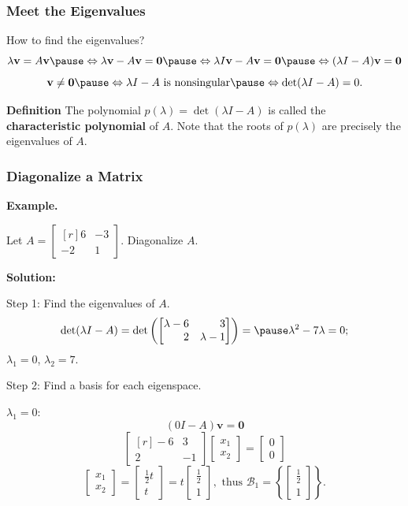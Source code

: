 \documentclass[10pt]{beamer}
\begin{document}
\begin{frame}
\frametitle{Meet the Eigenvalues}
How to find the eigenvalues?\pause
\[
\lambda\mathbf v = A\mathbf v\pause \Leftrightarrow \lambda\mathbf v - A\mathbf v = \mathbf 0\pause \Leftrightarrow
  \lambda I\mathbf v - A\mathbf v  = \mathbf 0 \pause \Leftrightarrow ( \lambda I - A)\mathbf v = \mathbf 0 \]
\pause
\[
\mathbf v \ne \mathbf 0\pause  \Leftrightarrow \lambda I - A\text{ is nonsingular}\pause \Leftrightarrow \det(\lambda I - A) = 0.
\]
\pause
\begin{tcolorbox}
{\bf Definition} The polynomial $p(\lambda) = \det(\lambda I - A)$ is called the {\bf characteristic polynomial} of $A$. Note that the roots of $p(\lambda)$ are precisely the eigenvalues of $A$.
\end{tcolorbox}
\end{frame}

\begin{frame}
\frametitle{Diagonalize a Matrix}

{\bf Example.} 

Let $A = \begin{bmatrix*}[r]
6&-3\\
-2&1
\end{bmatrix*}$. Diagonalize $A$.\pause

{\bf Solution:}

Step 1: Find the eigenvalues of $A$.
\[
\det(\lambda I - A) = \det\left(\begin{bmatrix*}[r]
\lambda - 6&3\\
2&\lambda - 1
\end{bmatrix*}\right) = \pause \lambda^2 - 7\lambda = 0;
\]
$\lambda_1 = 0$, $\lambda_2 = 7$.\pause

Step 2: Find a basis for each eigenspace.\pause

$\lambda_1 = 0$:\pause
\[
 (0 I - A)\mathbf v = \mathbf 0
\]
\pause
\[
\begin{bmatrix*}[r]
-6&3\\
2&-1
\end{bmatrix*}\begin{bmatrix}
x_1\\
x_2
\end{bmatrix} = \begin{bmatrix}
0\\0	
\end{bmatrix}
\]\pause
\[
\begin{bmatrix}
x_1\\
x_2	
\end{bmatrix} = \begin{bmatrix}
\frac{1}{2}t\\
t
\end{bmatrix} = t \begin{bmatrix}
\frac{1}{2}\\
1
\end{bmatrix}, \text{ thus } \mathscr B_1 = \left\{ \begin{bmatrix}
\frac{1}{2}\\
1
\end{bmatrix}\right\}.
\]

\end{frame}
\end{document}
